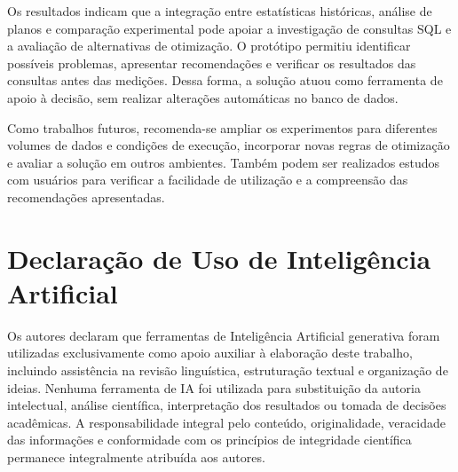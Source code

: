 \documentclass{UNESC}
\begin{document}
Os resultados indicam que a integração entre estatísticas históricas, análise de planos e comparação experimental pode apoiar a investigação de consultas SQL e a avaliação de alternativas de otimização. O protótipo permitiu identificar possíveis problemas, apresentar recomendações e verificar os resultados das consultas antes das medições. Dessa forma, a solução atuou como ferramenta de apoio à decisão, sem realizar alterações automáticas no banco de dados.

Como trabalhos futuros, recomenda-se ampliar os experimentos para diferentes volumes de dados e condições de execução, incorporar novas regras de otimização e avaliar a solução em outros ambientes. Também podem ser realizados estudos com usuários para verificar a facilidade de utilização e a compreensão das recomendações apresentadas.


\section*{Declaração de Uso de Inteligência Artificial}
Os autores declaram que ferramentas de Inteligência Artificial generativa foram utilizadas exclusivamente como apoio auxiliar à elaboração deste trabalho, incluindo assistência na revisão linguística, estruturação textual e organização de ideias. Nenhuma ferramenta de IA foi utilizada para substituição da autoria intelectual, análise científica, interpretação dos resultados ou tomada de decisões acadêmicas. A responsabilidade integral pelo conteúdo, originalidade, veracidade das informações e conformidade com os princípios de integridade científica permanece integralmente atribuída aos autores.


\FloatBarrier



\renewcommand{\refname}{REFERÊNCIAS}

\end{document}
